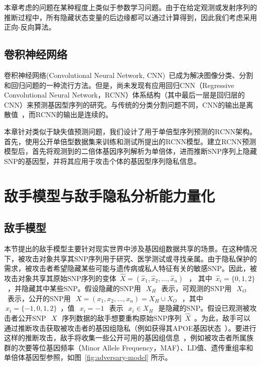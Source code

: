 本章考虑的问题在某种程度上类似于参数学习问题。由于在给定观测或发射序列的推断过程中，所有隐藏状态变量的后边缘都可以通过计算得到，因此我们考虑采用正向-反向算法。

\subsection{卷积神经网络}

卷积神经网络(Convolutional Neural Network, CNN)~\cite{long2017fully,scutti2018what}已成为解决图像分类、分割和回归问题的一种流行方法。但是，尚未发现有应用回归CNN（Regressive Convolutional Neural Network，RCNN）体系结构（其中最后一层是回归层的CNN）来预测基因型序列的研究。与传统的分类分割问题不同，CNN的输出是离散值~\cite{scutti2018what}，而RCNN的输出是连续的。

本章针对类似于缺失值预测问题，我们设计了用于单倍型序列预测的RCNN架构。首先，使用公开单倍型数据集来训练和测试所提出的RCNN模型。建立RCNN预测模型后，首先将观测到的二倍体基因序列解析为单倍体，进而推断SNP序列上隐藏SNP的基因型，并将其应用于攻击个体的基因型序列隐私信息。


\section{敌手模型与敌手隐私分析能力量化}\label{sec:adver}

\subsection{敌手模型}

本节提出的敌手模型主要针对现实世界中涉及基因组数据共享的场景。在这种情况下，被攻击对象共享其SNP序列用于研究、医学测试或寻找亲属。由于隐私保护的需求，被攻击者希望隐藏某些可能与遗传病或私人特征有关的敏感SNP。因此，被攻击对象共享其原始SNP序列的变体~$\hat{X}=(\hat{x}_1,\hat{x}_2, ... , \hat{x}_n)~$~， 其中~$\hat{x}_i =\{0,1,2\}$~，并隐藏其中某些SNP。假设隐藏的SNP用~$~X_H~$~表示，可观测的SNP用~$~X_O~$~表示，公开的SNP用~$~X=(x_1, x_2, ..., x_n)=X_H \cup X_O~$~，其中~$~x_i =\{-1,0,1,2\}$~，值~$~x_i=-1~$~表示~$~x_i\in X_H~$~是隐藏的SNP。假设已观测被攻击者公开SNP~$~X~$~序列数据的敌手想要重构原始SNP序列~$\hat{X}$~。为此，敌手可以通过推断攻击获取被攻击者的基因组隐私（例如获得其APOE基因状态~\cite{nyholt2009jim}）。要进行这样的推断攻击，敌手将收集一些公开可用的基因组信息~\cite{IGSR2019,howie2014impute2}，例如被攻击者所属族群的次要等位基因频率（Minor Allele Frequency，MAF）、LD值、遗传重组率和单倍体基因型参照，如图~\ref{fig:adversary-model} 所示。


